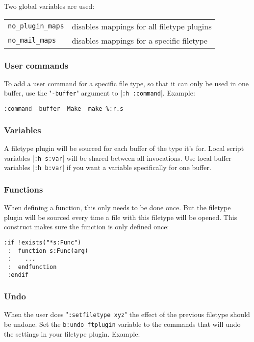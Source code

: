 Two global variables are used:
\begin{center} \begin{tabular}{l l}
				\texttt{no\_plugin\_maps} & disables mappings for all filetype plugins \\
				\texttt{no\_mail\_maps} & disables mappings for a specific filetype \\
\end{tabular} \end{center}

\subsubsection{User commands}
To add a user command for a specific file type, so that it can only be used in one buffer, use the "\texttt{-buffer}" argument to |\texttt{:h :command}|.
Example:

\begin{Verbatim}[samepage=true]
 :command -buffer  Make  make %:r.s
\end{Verbatim}

\subsubsection{Variables}
A filetype plugin will be sourced for each buffer of the type it's for.
Local script variables |\texttt{:h s:var}| will be shared between all invocations.
Use local buffer variables |\texttt{:h b:var}| if you want a variable specifically for one buffer.

\subsubsection{Functions}
When defining a function, this only needs to be done once.
But the filetype plugin will be sourced every time a file with this filetype will be opened.
This construct makes sure the function is only defined once:

\begin{Verbatim}[samepage=true]
 :if !exists("*s:Func")
 :  function s:Func(arg)
 :    ...
 :  endfunction
 :endif
\end{Verbatim}

\subsubsection{Undo}
\label{undo_ftplugin}

When the user does "\texttt{:setfiletype xyz}" the effect of the previous filetype should be undone.
Set the \texttt{b:undo\_ftplugin} variable to the commands that will undo the settings in your filetype plugin.
Example:


